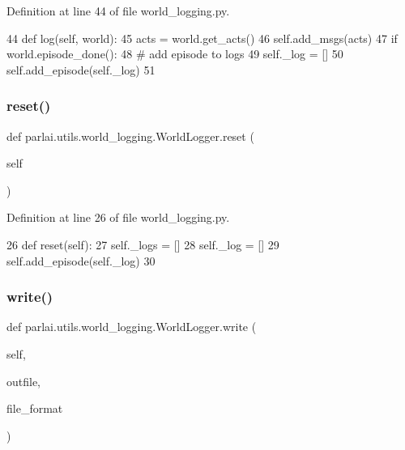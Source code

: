 Definition at line 44 of file world\+\_\+logging.\+py.


\begin{DoxyCode}
44     \textcolor{keyword}{def }log(self, world):
45         acts = world.get\_acts()
46         self.add\_msgs(acts)
47         \textcolor{keywordflow}{if} world.episode\_done():
48             \textcolor{comment}{# add episode to logs}
49             self.\_log = []
50             self.add\_episode(self.\_log)
51 
\end{DoxyCode}
\mbox{\label{classparlai_1_1utils_1_1world__logging_1_1WorldLogger_ae53d57ea1f9df92d06b7d63bd8235bd5}} 
\subsubsection{\texorpdfstring{reset()}{reset()}}
{\footnotesize\ttfamily def parlai.\+utils.\+world\+\_\+logging.\+World\+Logger.\+reset (\begin{DoxyParamCaption}\item[{}]{self }\end{DoxyParamCaption})}



Definition at line 26 of file world\+\_\+logging.\+py.


\begin{DoxyCode}
26     \textcolor{keyword}{def }reset(self):
27         self.\_logs = []
28         self.\_log = []
29         self.add\_episode(self.\_log)
30 
\end{DoxyCode}
\mbox{\label{classparlai_1_1utils_1_1world__logging_1_1WorldLogger_af895ff20c1c2b3896c46def75a968df0}} 
\subsubsection{\texorpdfstring{write()}{write()}}
{\footnotesize\ttfamily def parlai.\+utils.\+world\+\_\+logging.\+World\+Logger.\+write (\begin{DoxyParamCaption}\item[{}]{self,  }\item[{}]{outfile,  }\item[{}]{file\+\_\+format }\end{DoxyParamCaption})}



